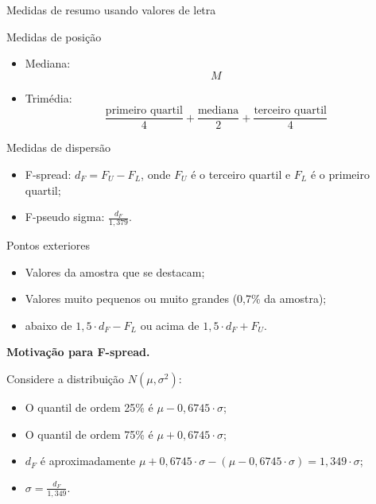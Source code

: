 \documentclass[
  10pt,
  ignorenonframetext,
]{beamer}
\providecommand{\tightlist}{%
  \setlength{\itemsep}{0pt}\setlength{\parskip}{0pt}}\usepackage{longtable,booktabs,array}
\begin{document}
\begin{frame}{Medidas de resumo usando valores de letra}
\protect\hypertarget{medidas-de-resumo-usando-valores-de-letra}{}
\begin{block}{Medidas de posição}
\protect\hypertarget{medidas-de-posiuxe7uxe3o}{}
\begin{itemize}
\tightlist
\item
  Mediana: \[M\]
\item
  Trimédia:
  \[\frac{\text{primeiro quartil}}{4} + \frac{\text{mediana}}{2} + \frac{\text{terceiro quartil}}{4}\]
\end{itemize}
\end{block}

\begin{block}{Medidas de dispersão}
\protect\hypertarget{medidas-de-dispersuxe3o}{}
\begin{itemize}
\tightlist
\item
  F-spread: \(d_F = F_U - F_L\), onde \(F_U\) é o terceiro quartil e
  \(F_L\) é o primeiro quartil;
\item
  F-pseudo sigma: \(\frac{d_F}{1,379}\).
\end{itemize}
\end{block}

\begin{block}{Pontos exteriores}
\protect\hypertarget{pontos-exteriores}{}
\begin{itemize}
\tightlist
\item
  Valores da amostra que se destacam;
\item
  Valores muito pequenos ou muito grandes (0,7\% da amostra);
\item
  abaixo de \(1,5\cdot d_F - F_L\) ou acima de \(1,5 \cdot d_F + F_U\).
\end{itemize}
\end{block}
\end{frame}

\begin{frame}
\textbf{Motivação para F-spread.}

Considere a distribuição \(N(\mu, \sigma^2)\):

\begin{itemize}
\tightlist
\item
  O quantil de ordem 25\% é \(\mu - 0,6745\cdot \sigma\);
\item
  O quantil de ordem 75\% é \(\mu + 0,6745\cdot \sigma\);
\item
  \(d_F\) é aproximadamente
  \(\mu + 0,6745\cdot \sigma - (\mu - 0,6745\cdot \sigma) = 1,349\cdot \sigma\);
\item
  \(\sigma = \frac{d_F}{1,349}\).
\end{itemize}
\end{frame}
\end{document}
